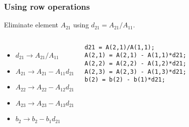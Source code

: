 \documentclass[11pt,table,final,xcolor={usenames,dvipsnames,table}]{beamer}
\begin{document}
\begin{frame}[fragile]
  \frametitle{Using row operations}
  Eliminate element $A_{21}$ using $d_{21}=A_{21}/A_{11}$.
  \vfill
  \vfill\pause
  \begin{columns}
  \begin{itemize}
    \item $d_{21}\rightarrow A_{21}/A_{11}$
    \item $A_{21}\rightarrow A_{21}-A_{11}d_{21}$
    \item $A_{22}\rightarrow A_{22}-A_{12}d_{21}$
    \item $A_{23}\rightarrow A_{23}-A_{13}d_{21}$
    \item $b_2   \rightarrow b_2   -b_1   d_{21}$
  \end{itemize}
  \pause
   \begin{lstlisting}
d21 = A(2,1)/A(1,1);
A(2,1) = A(2,1) - A(1,1)*d21;
A(2,2) = A(2,2) - A(1,2)*d21;
A(2,3) = A(2,3) - A(1,3)*d21;
b(2) = b(2) - b(1)*d21;
   \end{lstlisting}
  \end{columns}
\end{frame}
\end{document}
